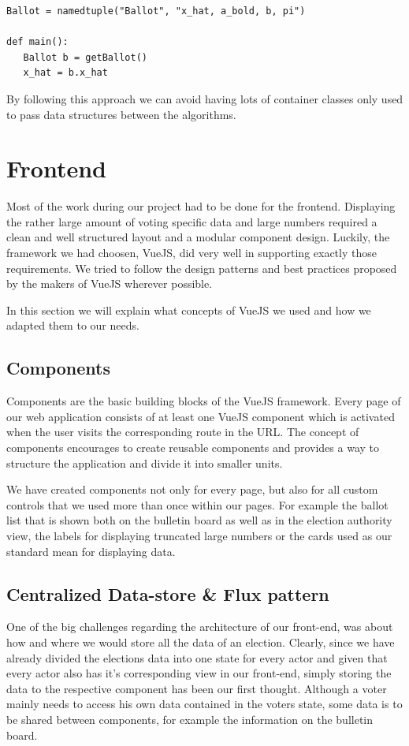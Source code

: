 \begin{verbatim}
Ballot = namedtuple("Ballot", "x_hat, a_bold, b, pi")

def main():
   Ballot b = getBallot()
   x_hat = b.x_hat
\end{verbatim}

By following this approach we can avoid having lots of container classes only used to pass data structures between the algorithms.

\section{Frontend}
Most of the work during our project had to be done for the frontend. Displaying the rather large amount of voting specific data and large numbers required a clean and well structured layout and a modular component design. Luckily, the framework we had choosen, VueJS, did very well in supporting exactly those requirements. We tried to follow the design patterns and best practices proposed by the makers of VueJS wherever possible.

In this section we will explain what concepts of VueJS we used and how we adapted them to our needs.

\subsection{Components}
Components are the basic building blocks of the VueJS framework. Every page of our web application consists of at least one VueJS component which is activated when the user visits the corresponding route in the URL. The concept of components encourages to create reusable components and provides a way to structure the application and divide it into smaller units.

We have created components not only for every page, but also for all custom controls that we used more than once within our pages. For example the ballot list that is shown both on the bulletin board as well as in the election authority view, the labels for displaying truncated large numbers or the cards used as our standard mean for displaying data.

\subsection{Centralized Data-store \& Flux pattern}
One of the big challenges regarding the architecture of our front-end, was about how and where we would store all the data of an election. Clearly, since we have already divided the elections data into one state for every actor and given that every actor also has it's corresponding view in our front-end, simply storing the data to the respective component has been our first thought. Although a voter mainly needs to access his own data contained in the voters state, some data is to be shared between components, for example the information on the bulletin board.

